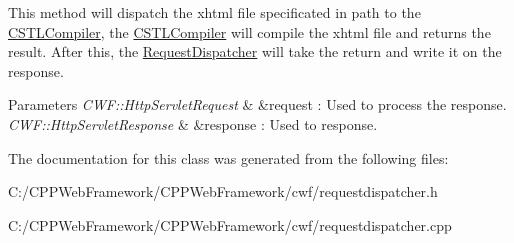 This method will dispatch the xhtml file specificated in path to the \mbox{\hyperlink{class_c_s_t_l_compiler}{C\+S\+T\+L\+Compiler}}, the \mbox{\hyperlink{class_c_s_t_l_compiler}{C\+S\+T\+L\+Compiler}} will compile the xhtml file and returns the result. After this, the \mbox{\hyperlink{class_request_dispatcher}{Request\+Dispatcher}} will take the return and write it on the response. 


\begin{DoxyParams}{Parameters}
{\em C\+W\+F\+::\+Http\+Servlet\+Request} & \&request \+: Used to process the response. \\
\hline
{\em C\+W\+F\+::\+Http\+Servlet\+Response} & \&response \+: Used to response. \\
\hline
\end{DoxyParams}


The documentation for this class was generated from the following files\+:\begin{DoxyCompactItemize}
\item 
C\+:/\+C\+P\+P\+Web\+Framework/\+C\+P\+P\+Web\+Framework/cwf/requestdispatcher.\+h\item 
C\+:/\+C\+P\+P\+Web\+Framework/\+C\+P\+P\+Web\+Framework/cwf/requestdispatcher.\+cpp\end{DoxyCompactItemize}
